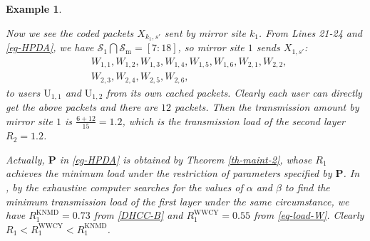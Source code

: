 \documentclass[onecolumn,10pt]{IEEEtran}
\theoremstyle{mythm}
\newtheorem{example}{Example}
\begin{document}
\begin{example}
\begin{itemize}
\begin{itemize}
Now we see the coded packets $X_{k_1,s'}$ sent by mirror site $k_1$. From Lines 21-24 and \eqref{eg-HPDA}, we have $\mathcal{S}_1\bigcap \mathcal{S}_{\text{m}}=[7:18]$, so mirror site $1$ sends $X_{1,s'}$:
    \begin{eqnarray*}
      &W_{1,1}, W_{1,2}, W_{1,3}, W_{1,4}, W_{1,5}, W_{1,6}, W_{2,1}, W_{2,2},\\
      &W_{2,3}, W_{2,4}, W_{2,5}, W_{2,6},
    \end{eqnarray*}
    to users $\text{U}_{1,1}$ and $\text{U}_{1,2}$ from its own cached packets. Clearly each user can directly get the above packets and there are $12$ packets. Then the transmission amount by mirror site $1$ is $\frac{6+12}{15}=1.2$, which is the transmission load of the second layer $R_2=1.2$.
\end{itemize}
\end{itemize}
Actually, $\mathbf{P}$ in \eqref{eg-HPDA} is obtained by Theorem \ref{th-maint-2}, whose $R_1$ achieves the minimum load under the restriction of parameters specified by $\mathbf{P}$. In \cite{KNMD,WWCY}, by the exhaustive computer searches for the values of $\alpha$ and $\beta$ to find the minimum transmission load of the first layer under the same circumstance, we have $R^{\text{KNMD}}_1=0.73$ from \eqref{DHCC-B} and $R^{\text{WWCY}}_1=0.55$ from \eqref{eq-load-W}. Clearly $R_1<R^{\text{WWCY}}_1<R^{\text{KNMD}}_1$.
\end{example}
\end{document}
